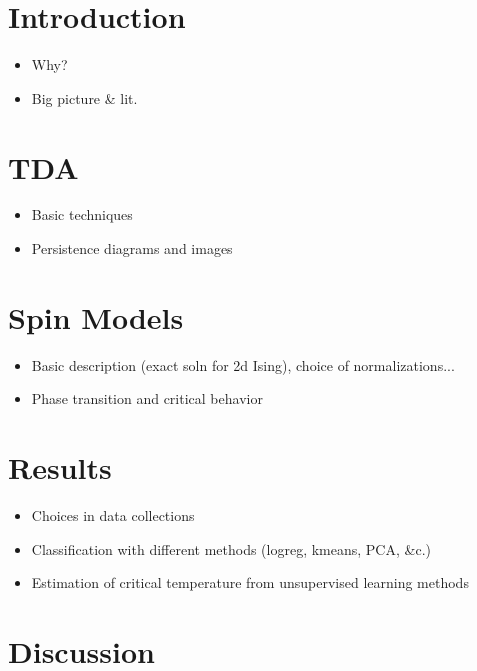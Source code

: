 \documentclass[11pt]{article}
\begin{document}
\tableofcontents

\section{Introduction}
\begin{itemize}
    \item Why?
    \item Big picture \& lit.
\end{itemize}


\section{TDA}
\begin{itemize}
    \item Basic techniques
    \item Persistence diagrams and images
\end{itemize}


\section{Spin Models}
\begin{itemize}
    \item Basic description (exact soln for 2d Ising), choice of normalizations...
    \item Phase transition and critical behavior
\end{itemize}


\section{Results}
\begin{itemize}
    \item Choices in data collections
    \item Classification with different methods (logreg, kmeans, PCA, \&c.)
    \item Estimation of critical temperature from unsupervised learning methods
\end{itemize}


\section{Discussion}
\end{document}
